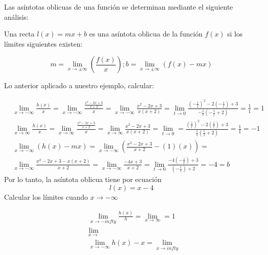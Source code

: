 \begin{example}
\begin{enumerate}
		      Las asíntotas oblicuas de una función se determinan mediante el siguiente análisis:

		      Una recta $l(x)=mx+b$ es una asíntota oblicua de la función $f(x)$ si los límites siguientes existen:

		      \begin{equation*}
			      m=\lim_{x\to \pm \infty}\left(\frac{f(x)}{x} \right); b=\lim_{x\to \pm \infty} (f(x)-mx)
		      \end{equation*}

		      Lo anterior aplicado a nuestro ejemplo, calcular:

		      \begin{align*}
			       & \lim_{x\to -\infty} \frac{h(x)}{x}=\lim_{x\to -\infty}\frac{\frac{x^2-2x+3}{x+2}}{x}=\lim_{x\to -\infty} \frac{x^2-2x+3}{x(x+2)}=\lim_{t \to  0} \frac{\left( -\frac{1}{t} \right)^2-2\left( -\frac{1}{t} \right)+3}{-\frac{1}{t}\left( -\frac{1}{t}+2 \right)}=\frac{1}{1}=1 \\
			       & \lim_{x\to \infty} \frac{h(x)}{x}=\lim_{x\to \infty}\frac{\frac{x^2-2x+3}{x+2}}{x}=\lim_{x\to \infty} \frac{x^2-2x+3}{x(x+2)}=\lim_{t \to 0} =\frac{\left(\frac{1}{t} \right)^2-2\left(\frac{1}{t} \right)+3}{\frac{1}{t}\left(\frac{1}{t}+2 \right)}=\frac{1}{1}=-1          \\
			       & \lim_{x\to -\infty}\left(h(x)-mx\right)=\lim_{x\to -\infty}\left(\frac{x^2-2x+3}{x+2}-(1)(x) \right)=                                                                                                                                                                         \\
			       & \lim_{x\to -\infty} \frac{x^2-2x+3-x(x+2)}{x+2}=\lim_{x\to -\infty} \frac{-4x+3}{x+2}=\lim_{t\to 0}\frac{-4\left(-\frac{1}{t} \right)+3}{\left(-\frac{1}{t} \right)+2}=-4=b
		      \end{align*}
		      Por lo tanto, la asíntota oblicua tiene por ecuación
		      \begin{equation*}
			      l(x)=x-4
		      \end{equation*}
		      Calcular los límites cuando $x\to -\infty$

		      \begin{align*}
			       & \lim_{x\to -infty}\frac{h(x)}{h}=\lim_{x\to \infty}=1 \\
			       & \lim_{x\to }                                          \\
			       & \lim_{x\to -\infty}h(x)-x=\lim_{x\to infty}
		      \end{align*}


\end{enumerate}
\end{example}
